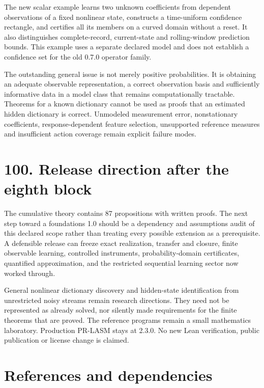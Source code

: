 \documentclass[11pt,letterpaper]{article}
\begin{document}
The new scalar example learns two unknown coefficients from dependent
observations of a fixed nonlinear state, constructs a time-uniform
confidence rectangle, and certifies all its members on a curved domain
without a reset. It also distinguishes complete-record, current-state
and rolling-window prediction bounds. This example uses a separate
declared model and does not establish a confidence set for the old 0.7.0
operator family.

The outstanding general issue is not merely positive probabilities. It
is obtaining an adequate observable representation, a correct
observation basis and sufficiently informative data in a model class
that remains computationally tractable. Theorems for a known dictionary
cannot be used as proofs that an estimated hidden dictionary is correct.
Unmodeled measurement error, nonstationary coefficients,
response-dependent feature selection, unsupported reference measures and
insufficient action coverage remain explicit failure modes.

\section{100. Release direction after the eighth
block}\label{release-direction-after-the-eighth-block}

The cumulative theory contains 87 propositions with written proofs. The
next step toward a foundations 1.0 should be a dependency and
assumptions audit of this declared scope rather than treating every
possible extension as a prerequisite. A defensible release can freeze
exact realization, transfer and closure, finite observable learning,
controlled instruments, probability-domain certificates, quantified
approximation, and the restricted sequential learning sector now worked
through.

General nonlinear dictionary discovery and hidden-state identification
from unrestricted noisy streams remain research directions. They need
not be represented as already solved, nor silently made requirements for
the finite theorems that are proved. The reference programs remain a
small mathematics laboratory. Production PR-LASM stays at 2.3.0. No new
Lean verification, public publication or license change is claimed.

\begingroup
\small
\raggedright

\section{References and dependencies}\label{references-and-dependencies}
\end{document}

